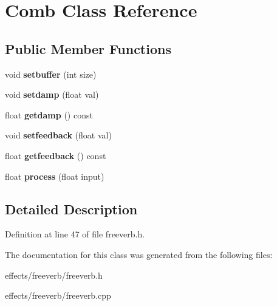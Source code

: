 \hypertarget{class_comb}{}\section{Comb Class Reference}
\label{class_comb}
\subsection*{Public Member Functions}
\begin{DoxyCompactItemize}
\item 
\mbox{\label{class_comb_a2cf86560caaeeae30ab9b1431dd9002c}} 
void {\bfseries setbuffer} (int size)
\item 
\mbox{\label{class_comb_a8db844a68b73549b717a43e5c55ad28f}} 
void {\bfseries setdamp} (float val)
\item 
\mbox{\label{class_comb_aedf3204770be9d09261e9d9d2dd78e76}} 
float {\bfseries getdamp} () const
\item 
\mbox{\label{class_comb_a21aa71e1666b60c4d09d8b9f9db89a23}} 
void {\bfseries setfeedback} (float val)
\item 
\mbox{\label{class_comb_a4896b3bd762f0e1fb62b7bf3062023d7}} 
float {\bfseries getfeedback} () const
\item 
\mbox{\label{class_comb_a9da61492b60a9163903040ba0f8bfa08}} 
float {\bfseries process} (float input)
\end{DoxyCompactItemize}


\subsection{Detailed Description}


Definition at line 47 of file freeverb.\+h.



The documentation for this class was generated from the following files\+:\begin{DoxyCompactItemize}
\item 
effects/freeverb/freeverb.\+h\item 
effects/freeverb/freeverb.\+cpp\end{DoxyCompactItemize}
